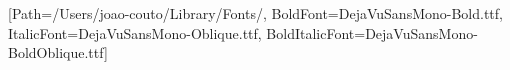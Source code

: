 \setmonofont{DejaVuSansMono.ttf}[Path=/Users/joao-couto/Library/Fonts/, BoldFont=DejaVuSansMono-Bold.ttf, ItalicFont=DejaVuSansMono-Oblique.ttf, BoldItalicFont=DejaVuSansMono-BoldOblique.ttf]
